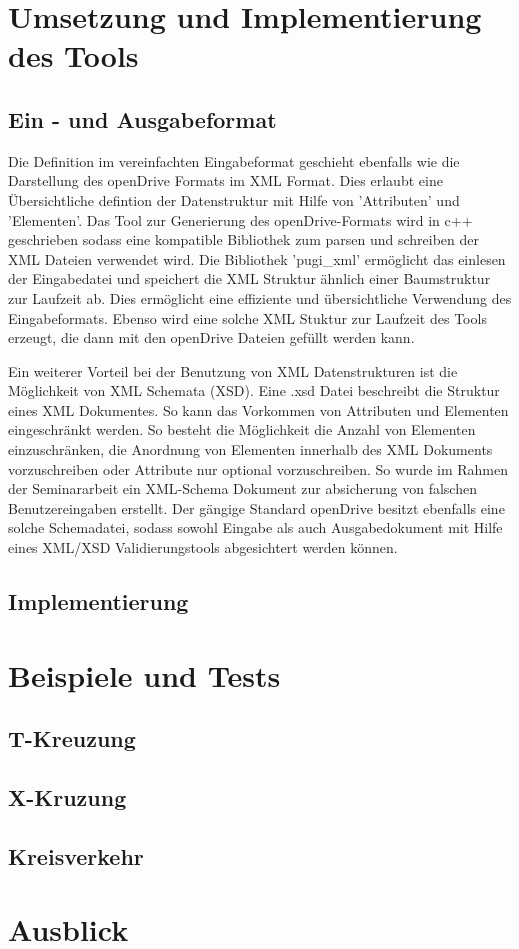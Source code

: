 \chapter{Umsetzung und Implementierung des Tools}
\section{Ein - und Ausgabeformat}
Die Definition im vereinfachten Eingabeformat geschieht ebenfalls wie die Darstellung des openDrive Formats im XML Format. Dies erlaubt eine Übersichtliche defintion der Datenstruktur mit Hilfe von 'Attributen' und 'Elementen'. Das Tool zur Generierung des openDrive-Formats wird in c++ geschrieben sodass eine kompatible Bibliothek zum parsen und schreiben der XML Dateien verwendet wird. Die Bibliothek 'pugi_xml' ermöglicht das einlesen der Eingabedatei und speichert die XML Struktur ähnlich einer Baumstruktur zur Laufzeit ab. Dies ermöglicht eine effiziente und übersichtliche Verwendung des Eingabeformats. Ebenso wird eine solche XML Stuktur zur Laufzeit des Tools erzeugt, die dann mit den openDrive Dateien gefüllt werden kann. 

Ein weiterer Vorteil bei der Benutzung von XML Datenstrukturen ist die Möglichkeit von XML Schemata (XSD). Eine .xsd Datei beschreibt die Struktur eines XML Dokumentes. So kann das Vorkommen von Attributen und Elementen eingeschränkt werden. So besteht die Möglichkeit die Anzahl von Elementen einzuschränken, die Anordnung von Elementen innerhalb des XML Dokuments vorzuschreiben oder Attribute nur optional vorzuschreiben. So wurde im Rahmen der Seminararbeit ein XML-Schema Dokument zur absicherung von falschen Benutzereingaben erstellt. Der gängige Standard openDrive besitzt ebenfalls eine solche Schemadatei, sodass sowohl Eingabe als auch Ausgabedokument mit Hilfe eines XML/XSD Validierungstools abgesichtert werden können.
 
\section{Implementierung}

\chapter{Beispiele und Tests}
\section{T-Kreuzung}
\section{X-Kruzung}
\section{Kreisverkehr}

\chapter{Ausblick}


